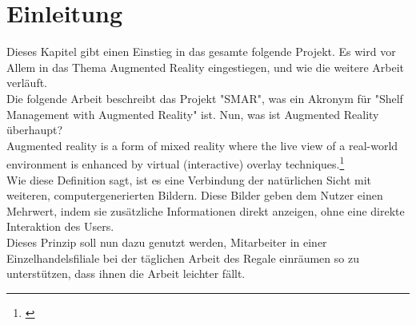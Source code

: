 \chapter*{Einleitung}
\label{cha_einleitung}
Dieses Kapitel gibt einen Einstieg in das gesamte folgende Projekt. Es wird vor Allem in das Thema Augmented Reality eingestiegen, und wie die weitere Arbeit verläuft. 
\\
Die folgende Arbeit beschreibt das Projekt "SMAR", was ein Akronym für "Shelf Management with Augmented Reality" ist. Nun, was ist Augmented Reality überhaupt? 
\\
\glqq Augmented reality is a form of mixed reality where the live view of a real-world environment is enhanced by virtual (interactive) overlay techniques.\footnote{\citep{augmented_reality}} \grqq 
\\
Wie diese Definition sagt, ist es eine Verbindung der natürlichen Sicht mit weiteren, computergenerierten Bildern. Diese Bilder geben dem Nutzer einen Mehrwert, indem sie zusätzliche Informationen direkt anzeigen, ohne eine direkte Interaktion des Users. 
\\
Dieses Prinzip soll nun dazu genutzt werden, Mitarbeiter in einer Einzelhandelsfiliale bei der täglichen Arbeit des Regale einräumen so zu unterstützen, dass ihnen die Arbeit leichter fällt. 